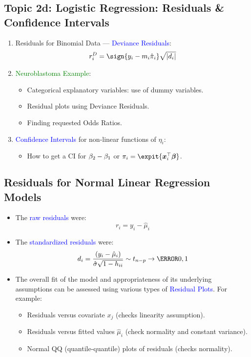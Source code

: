 \documentclass[oneside]{book}\usepackage[]{graphicx}\usepackage[svgnames]{xcolor}
\let\exp\relax%
\DeclarePairedDelimiter\abs{\lvert}{\rvert}
\providecommand{\Vector}[1]{\bm{#1}}%
\begin{document}
\subsection*{Topic 2d: Logistic Regression: Residuals \& Confidence Intervals}
\begin{enumerate}
      \item Residuals for Binomial Data --- \textcolor{Blue}{Deviance Residuals}:
            \[ r_i^D=\sign{y_i-m_i\hat{\pi}_i}\sqrt{\abs{d_i}} \]
      \item \textcolor{Green}{Neuroblastoma Example}:
            \begin{itemize}
                  \item Categorical explanatory variables: use of dummy variables.
                  \item Residual plots using Deviance Residuals.
                  \item Finding requested Odds Ratios.
            \end{itemize}
      \item \textcolor{Blue}{Confidence Intervals} for non-linear functions of $ \eta_i $:
            \begin{itemize}
                  \item How to get a CI for $ \exp{\beta_2-\beta_1} $ or $ \pi_i=\expit{\Vector{x}_i^\top \Vector{\beta}} $.
            \end{itemize}
\end{enumerate}
\subsection*{Residuals for Normal Linear Regression Models}
\begin{itemize}
      \item The \textcolor{Blue}{raw residuals} were:
            \[ r_i=y_i-\hat{\mu}_i \]
      \item The \textcolor{Blue}{standardized residuals} were:
            \[ d_i=\frac{(y_i-\hat{\mu}_i)}{\hat{\sigma}\sqrt{1-h_{ii}}}\sim t_{n-p}\to \N{0,1}  \]
      \item The overall fit of the model and appropriateness of its underlying assumptions can
            be assessed using various types of \textcolor{Blue}{Residual Plots}. For example:
            \begin{itemize}
                  \item Residuals versus covariate $ x_j $ (checks linearity assumption).
                  \item Residuals versus fitted values $ \hat{\mu}_i $ (check normality and constant variance).
                  \item Normal QQ (quantile-quantile) plots of residuals (checks normality).
            \end{itemize}
\end{itemize}
\end{document}
